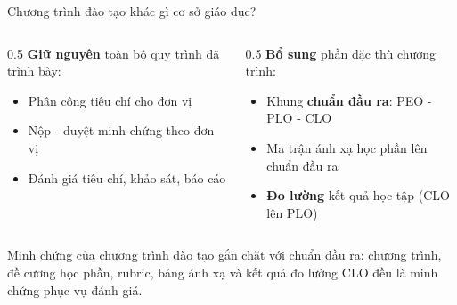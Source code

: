 \documentclass[aspectratio=169, 11pt]{beamer}
\begin{document}
\begin{frame}{Chương trình đào tạo khác gì cơ sở giáo dục?}
\vspace{0.15cm}
\begin{columns}[T]
\begin{column}{0.5\textwidth}\footnotesize
\textbf{\color{daumaroon}Giữ nguyên} toàn bộ quy trình đã trình bày:
\begin{itemize}
  \item Phân công tiêu chí cho đơn vị
  \item Nộp - duyệt minh chứng theo đơn vị
  \item Đánh giá tiêu chí, khảo sát, báo cáo
\end{itemize}
\end{column}
\begin{column}{0.5\textwidth}\footnotesize
\textbf{\color{daunavy}Bổ sung} phần đặc thù chương trình:
\begin{itemize}
  \item Khung \textbf{chuẩn đầu ra}: PEO - PLO - CLO
  \item Ma trận ánh xạ học phần lên chuẩn đầu ra
  \item \textbf{Đo lường} kết quả học tập (CLO lên PLO)
\end{itemize}
\end{column}
\end{columns}
\vspace{0.15cm}
\begin{keypoint}
Minh chứng của chương trình đào tạo gắn chặt với chuẩn đầu ra: chương trình, đề cương học phần, rubric, bảng ánh xạ và kết quả đo lường CLO đều là minh chứng phục vụ đánh giá.
\end{keypoint}
\end{frame}
\end{document}

